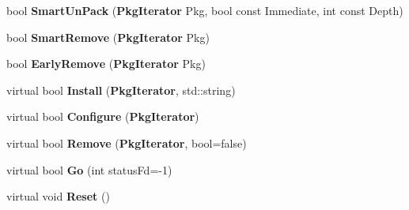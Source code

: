 \begin{DoxyCompactItemize}
\item 
bool {\bfseries \-Smart\-Un\-Pack} ({\bf \-Pkg\-Iterator} \-Pkg, bool const \-Immediate, int const \-Depth)\label{classpkgPackageManager_a5979b746aa36d812138bbe92a12810e8}

\item 
bool {\bfseries \-Smart\-Remove} ({\bf \-Pkg\-Iterator} \-Pkg)\label{classpkgPackageManager_a331749d6ceb06d7ddb46b7892487d40f}

\item 
bool {\bfseries \-Early\-Remove} ({\bf \-Pkg\-Iterator} \-Pkg)\label{classpkgPackageManager_ae16d6bbf149b846806bd80f85b8cb253}

\item 
virtual bool {\bfseries \-Install} ({\bf \-Pkg\-Iterator}, std\-::string)\label{classpkgPackageManager_a7b9735503373c5fd53e64cec815d1e2a}

\item 
virtual bool {\bfseries \-Configure} ({\bf \-Pkg\-Iterator})\label{classpkgPackageManager_a5bbe81ac5e83c9907ff4f3aa0ed0bef5}

\item 
virtual bool {\bfseries \-Remove} ({\bf \-Pkg\-Iterator}, bool=false)\label{classpkgPackageManager_a69ec94244f0f5815b7382528df9e2068}

\item 
virtual bool {\bfseries \-Go} (int status\-Fd=-\/1)\label{classpkgPackageManager_a6d85af18780f3a758d2d3a795a7df1c5}

\item 
virtual void {\bfseries \-Reset} ()\label{classpkgPackageManager_a4c4ba0ffe635d14b93794268bd8e5995}

\end{DoxyCompactItemize}
